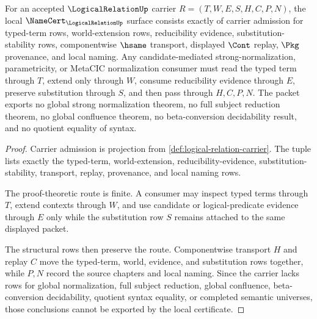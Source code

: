 \begin{theorem}\label{thm:logical-relation-namecert-obligations}
For an accepted $\LogicalRelationUp$ carrier $R=(T,W,E,S,H,C,P,N)$, the local $\NameCert_{\LogicalRelationUp}$ surface consists exactly of carrier admission for typed-term rows, world-extension rows, reducibility evidence, substitution-stability rows, componentwise $\hsame$ transport, displayed $\Cont$ replay, $\Pkg$ provenance, and local naming. Any candidate-mediated strong-normalization, parametricity, or MetaCIC normalization consumer must read the typed term through $T$, extend only through $W$, consume reducibility evidence through $E$, preserve substitution through $S$, and then pass through $H,C,P,N$. The packet exports no global strong normalization theorem, no full subject reduction theorem, no global confluence theorem, no beta-conversion decidability result, and no quotient equality of syntax.
\end{theorem}
\begin{proof}
Carrier admission is projection from \autoref{def:logical-relation-carrier}. The tuple lists exactly the typed-term, world-extension, reducibility-evidence, substitution-stability, transport, replay, provenance, and local naming rows.

The proof-theoretic route is finite. A consumer may inspect typed terms through $T$, extend contexts through $W$, and use candidate or logical-predicate evidence through $E$ only while the substitution row $S$ remains attached to the same displayed packet.

The structural rows then preserve the route. Componentwise transport $H$ and replay $C$ move the typed-term, world, evidence, and substitution rows together, while $P,N$ record the source chapters and local naming. Since the carrier lacks rows for global normalization, full subject reduction, global confluence, beta-conversion decidability, quotient syntax equality, or completed semantic universes, those conclusions cannot be exported by the local certificate.
\end{proof}


